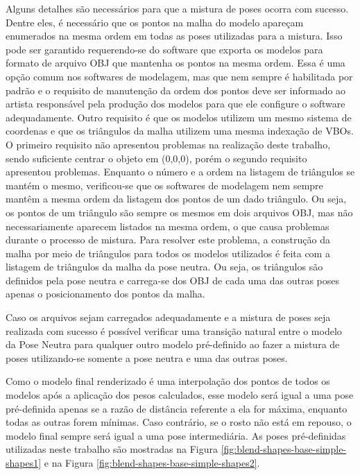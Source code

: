 Alguns detalhes são necessários para que a mistura de poses ocorra com sucesso. Dentre eles, é necessário que os pontos na malha do modelo apareçam enumerados na mesma ordem em todas as poses utilizadas para a mistura. Isso pode ser garantido requerendo-se do software que exporta os modelos para formato de arquivo OBJ que mantenha os pontos na mesma ordem. Essa é uma opção comum nos softwares de modelagem, mas que nem sempre é habilitada por padrão e o requisito de manutenção da ordem dos pontos deve ser informado ao artista responsável pela produção dos modelos para que ele configure o software adequadamente. Outro requisito é que os modelos utilizem um mesmo sistema de coordenas e que os triângulos da malha utilizem uma mesma indexação de VBOs. O primeiro requisito não apresentou problemas na realização deste trabalho, sendo suficiente centrar o objeto em (0,0,0), porém o segundo requisito apresentou problemas. Enquanto o número e a ordem na listagem de triângulos se mantém o mesmo, verificou-se que os softwares de modelagem nem sempre mantêm a mesma ordem da listagem dos pontos de um dado triângulo. Ou seja, os pontos de um triângulo são sempre os mesmos em dois arquivos OBJ, mas não necessariamente aparecem listados na mesma ordem, o que causa problemas durante o processo de mistura. Para resolver este problema, a construção da malha por meio de triângulos para todos os modelos utilizados é feita com a listagem de triângulos da malha da pose neutra. Ou seja, os triângulos são definidos pela pose neutra e carrega-se dos OBJ de cada uma das outras poses apenas o posicionamento dos pontos da malha.

Caso os arquivos sejam carregados adequadamente e a mistura de poses seja realizada com sucesso é possível verificar uma transição natural entre o modelo da Pose Neutra para qualquer outro modelo pré-definido ao fazer a mistura de poses utilizando-se somente a pose neutra e uma das outras poses.

Como o modelo final renderizado é uma interpolação dos pontos de todos os modelos após a aplicação dos pesos calculados, esse modelo será igual a uma pose pré-definida apenas se a razão de distância referente a ela for máxima, enquanto todas as outras forem mínimas. Caso contrário, se o rosto não está em repouso, o modelo final sempre será igual a uma pose intermediária. As poses pré-definidas utilizadas neste trabalho são mostradas na Figura \ref{fig:blend-shapes-base-simple-shapes1} e na Figura \ref{fig:blend-shapes-base-simple-shapes2}.



